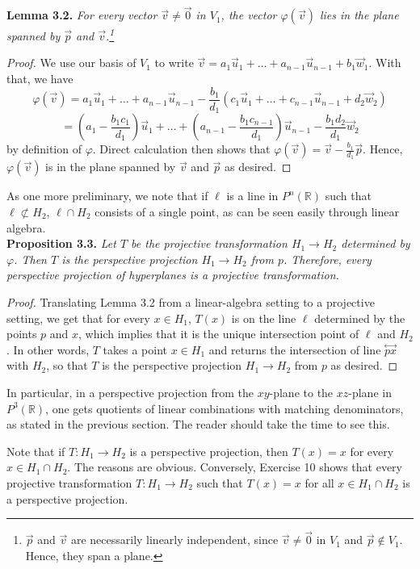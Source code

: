 \documentclass[leqno]{book}
\begin{document}
\noindent\textbf{Lemma 3.2.} \emph{For every vector $\vec v\ne\vec 0$ in $V_1$, the vector $\varphi(\vec v)$ lies in the plane spanned by $\vec p$ and $\vec v$.\footnote{$\vec p$ and $\vec v$ are necessarily linearly independent, since $\vec v\ne\vec 0$ in $V_1$ and $\vec p\notin V_1$.  Hence, they span a plane.}}
\begin{proof}
We use our basis of $V_1$ to write $\vec v=a_1\vec u_1+\dots+a_{n-1}\vec u_{n-1}+b_1\vec w_1$.  With that, we have
$$\varphi(\vec v)=a_1\vec u_1+\dots+a_{n-1}\vec u_{n-1}-\frac{b_1}{d_1}(c_1\vec u_1+\dots+c_{n-1}\vec u_{n-1}+d_2\vec w_2)$$
$$=\left(a_1-\frac{b_1c_1}{d_1}\right)\vec u_1+\dots+\left(a_{n-1}-\frac{b_1c_{n-1}}{d_1}\right)\vec u_{n-1}-\frac{b_1d_2}{d_1}\vec w_2$$
by definition of $\varphi$.  Direct calculation then shows that $\varphi(\vec v)=\vec v-\frac{b_1}{d_1}\vec p$.  Hence, $\varphi(\vec v)$ is in the plane spanned by $\vec v$ and $\vec p$ as desired.
\end{proof}
\noindent As one more preliminary, we note that if $\ell$ is a line in $P^n(\mathbb R)$ such that $\ell\not\subset H_2$, $\ell\cap H_2$ consists of a single point, as can be seen easily through linear algebra.\\

\noindent\textbf{Proposition 3.3.} \emph{Let $T$ be the projective transformation $H_1\to H_2$ determined by $\varphi$.  Then $T$ is the perspective projection $H_1\to H_2$ from $p$.  Therefore, every perspective projection of hyperplanes is a projective transformation.}
\begin{proof}
Translating Lemma 3.2 from a linear-algebra setting to a projective setting, we get that for every $x\in H_1$, $T(x)$ is on the line $\ell$ determined by the points $p$ and $x$, which implies that it is the unique intersection point of $\ell$ and $H_2$.  In other words, $T$ takes a point $x\in H_1$ and returns the intersection of line $\overset{\longleftrightarrow}{px}$ with $H_2$, so that $T$ is the perspective projection $H_1\to H_2$ from $p$ as desired.
\end{proof}
\noindent In particular, in a perspective projection from the $xy$-plane to the $xz$-plane in $P^3(\mathbb R)$, one gets quotients of linear combinations with matching denominators, as stated in the previous section.  The reader should take the time to see this.

Note that if $T:H_1\to H_2$ is a perspective projection, then $T(x)=x$ for every $x\in H_1\cap H_2$.  The reasons are obvious.  Conversely, Exercise 10 shows that every projective transformation $T:H_1\to H_2$ such that $T(x)=x$ for all $x\in H_1\cap H_2$ is a perspective projection.
\end{document}
